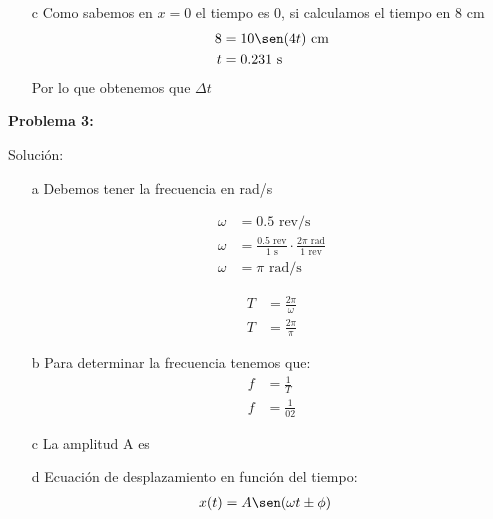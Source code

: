 \documentclass[letterpaper,12pt,addpoints]{exam}
\begin{document}
{\begin{enumerate}
\item[c] Como sabemos en $x=0$ el tiempo es 0, si calculamos el tiempo en 8 cm
\begin{align*}
8 &= 10\sen(4 t)\,\,\mathrm{cm}\\
t &= 0.231\,\,\mathrm{s}
\end{align*}
Por lo que obtenemos que $\Delta t$
\begin{center}
\end{center}
\end{enumerate}
}

\clearpage
\textbf{Problema 3:}


{\color{ceruleanblue}
Solución:\\
\begin{enumerate}
\item[a] Debemos tener la frecuencia en rad/s


\begin{minipage}[t]{0.5\textwidth}
\begin{align*}
\omega &= 0.5\,\,\mathrm{rev/s}\\
\omega &= \frac{0.5\,\,\mathrm{rev}}{1\,\,\mathrm{s}} \cdot\frac{2\pi\,\,\mathrm{rad}}{1\,\,\mathrm{rev}}\\
\omega &=\pi\,\,\mathrm{rad/s}
\end{align*}
\end{minipage}
\begin{minipage}[t]{0.5\textwidth}
\begin{align*}
T &= \frac{2\pi}{\omega}\\
T &= \frac{2\pi}{\pi}
\end{align*}
\end{minipage}
\begin{center}
\end{center}
\item[b] Para determinar la frecuencia tenemos que:
\begin{align*}
f &=\frac{1}{T}\\
f &=\frac{1}{02}
\end{align*}
\begin{center}
\end{center}
\item[c] La amplitud A es
\begin{center}
\end{center}
\item[d] Ecuación de desplazamiento en función del tiempo:
\begin{align*}
x(t) &= A\sen(\omega t \pm \phi) 
\end{align*}
\begin{center}
\end{center}


\end{enumerate}
}
\end{document}
